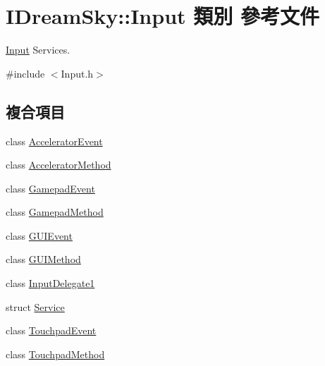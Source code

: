 \hypertarget{class_i_dream_sky_1_1_input}{}\section{I\+Dream\+Sky\+:\+:Input 類別 參考文件}
\label{class_i_dream_sky_1_1_input}


\hyperlink{class_i_dream_sky_1_1_input}{Input} Services.  




{\ttfamily \#include $<$Input.\+h$>$}

\subsection*{複合項目}
\begin{DoxyCompactItemize}
\item 
class \hyperlink{class_i_dream_sky_1_1_input_1_1_accelerator_event}{Accelerator\+Event}
\item 
class \hyperlink{class_i_dream_sky_1_1_input_1_1_accelerator_method}{Accelerator\+Method}
\item 
class \hyperlink{class_i_dream_sky_1_1_input_1_1_gamepad_event}{Gamepad\+Event}
\item 
class \hyperlink{class_i_dream_sky_1_1_input_1_1_gamepad_method}{Gamepad\+Method}
\item 
class \hyperlink{class_i_dream_sky_1_1_input_1_1_g_u_i_event}{G\+U\+I\+Event}
\item 
class \hyperlink{class_i_dream_sky_1_1_input_1_1_g_u_i_method}{G\+U\+I\+Method}
\item 
class \hyperlink{class_i_dream_sky_1_1_input_1_1_input_delegate1}{Input\+Delegate1}
\item 
struct \hyperlink{struct_i_dream_sky_1_1_input_1_1_service}{Service}
\item 
class \hyperlink{class_i_dream_sky_1_1_input_1_1_touchpad_event}{Touchpad\+Event}
\item 
class \hyperlink{class_i_dream_sky_1_1_input_1_1_touchpad_method}{Touchpad\+Method}
\end{DoxyCompactItemize}

